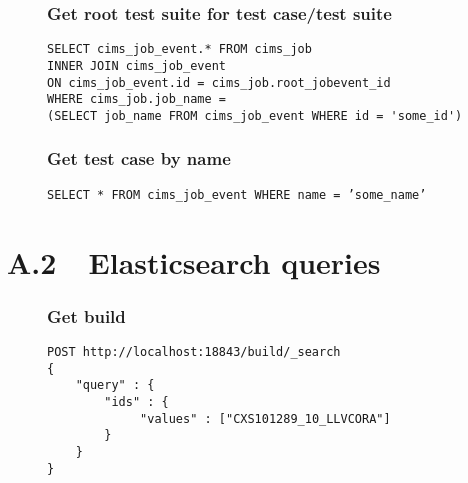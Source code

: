 
\begin{figure}[H]
\subsubsection*{Get root test suite for test case/test suite}
\begin{mdframed}
\label{q:getrootts}
\begin{verbatim}
SELECT cims_job_event.* FROM cims_job
INNER JOIN cims_job_event 
ON cims_job_event.id = cims_job.root_jobevent_id
WHERE cims_job.job_name =
(SELECT job_name FROM cims_job_event WHERE id = 'some_id')
\end{verbatim}
\end{mdframed}
\end{figure}

\begin{figure}
\subsubsection*{Get test case by name}
\begin{mdframed}
\label{q:gettcbyname}
{\tt SELECT * FROM cims\_job\_event WHERE name = 'some\_name' }
\end{mdframed}
\end{figure}



\section*{A.2\ \ Elasticsearch queries}

\begin{figure}[H]
\label{q:getbuildEs}
\subsubsection*{Get build}
\begin{mdframed}
\begin{verbatim}
POST http://localhost:18843/build/_search
{ 
    "query" : {
        "ids" : { 
             "values" : ["CXS101289_10_LLVCORA"]
        }
    }
}
\end{verbatim}
\end{mdframed}
\end{figure}

